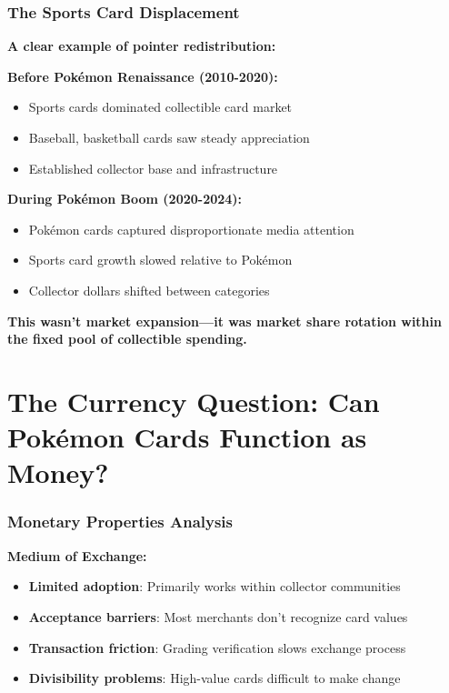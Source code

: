\documentclass[11pt,oneside]{book}
\begin{document}
{{{{{{\subsubsection{The Sports Card Displacement}

\textbf{A clear example of pointer redistribution:}

\textbf{Before Pokémon Renaissance (2010-2020):}
\begin{itemize}
\item Sports cards dominated collectible card market
\item Baseball, basketball cards saw steady appreciation
\item Established collector base and infrastructure
\end{itemize}

\textbf{During Pokémon Boom (2020-2024):}
\begin{itemize}
\item Pokémon cards captured disproportionate media attention
\item Sports card growth slowed relative to Pokémon
\item Collector dollars shifted between categories
\end{itemize}

\textbf{This wasn't market expansion—it was market share rotation within the fixed pool of collectible spending.}

\section{The Currency Question: Can Pokémon Cards Function as Money?}

\subsubsection{Monetary Properties Analysis}

\textbf{Medium of Exchange:}
\begin{itemize}
\item \textbf{Limited adoption}: Primarily works within collector communities
\item \textbf{Acceptance barriers}: Most merchants don't recognize card values
\item \textbf{Transaction friction}: Grading verification slows exchange process
\item \textbf{Divisibility problems}: High-value cards difficult to make change
\end{itemize}

}}}}}}
\end{document}

